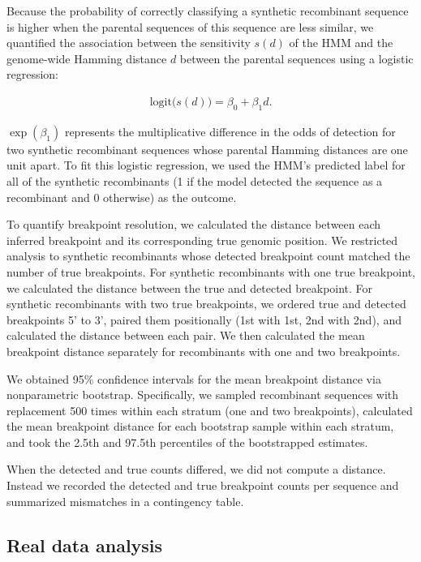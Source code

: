 \documentclass[11pt,oneside,letterpaper]{article}
\begin{document}
Because the probability of correctly classifying a synthetic recombinant sequence is higher when the parental sequences of this sequence are less similar, we quantified the association between the sensitivity \(s(d)\) of the HMM and the genome-wide Hamming distance \(d\) between the parental sequences using a logistic regression:

\begin{align*}
  \text{logit}\!\bigl(s(d)\bigr)=\beta_{0}+\beta_{1}d.
  \label{eq:logistic_sensitivity}
\end{align*}

$\exp(\beta_{1})$ represents the multiplicative difference in the odds of detection for two synthetic recombinant sequences whose parental Hamming distances are one unit apart. To fit this logistic regression, we used the HMM's predicted label for all of the synthetic recombinants (1 if the model detected the sequence as a recombinant and 0 otherwise) as the outcome. 

To quantify breakpoint resolution, we calculated the distance between each inferred breakpoint and its corresponding true genomic position. We restricted analysis to synthetic recombinants whose detected breakpoint count matched the number of true breakpoints. For synthetic recombinants with one true breakpoint, we calculated the distance between the true and detected breakpoint. For synthetic recombinants with two true breakpoints, we ordered true and detected breakpoints 5' to 3', paired them positionally (1st with 1st, 2nd with 2nd), and calculated the distance between each pair. We then calculated the mean breakpoint distance separately for recombinants with one and two breakpoints.

We obtained 95\% confidence intervals for the mean breakpoint distance via nonparametric bootstrap. Specifically, we sampled recombinant sequences with replacement 500 times within each stratum (one and two breakpoints), calculated the mean breakpoint distance for each bootstrap sample within each stratum, and took the 2.5th and 97.5th percentiles of the bootstrapped estimates.

When the detected and true counts differed, we did not compute a distance. Instead we recorded the detected and true breakpoint counts per sequence and summarized mismatches in a contingency table.

\subsection{Real data analysis}\label{sec:methods_real_data}
\end{document}

